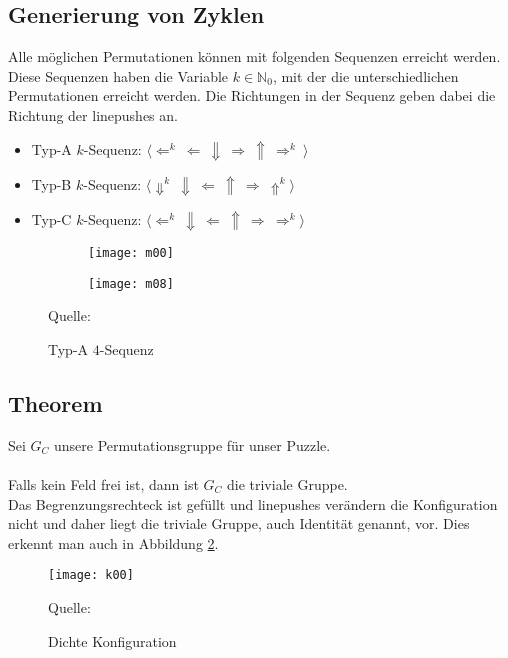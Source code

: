 \documentclass[seminar,german]{algothesis}
\newcommand*{\quelle}{%
  \footnotesize Quelle:
}
\begin{document}
\subsection{Generierung von Zyklen}
Alle möglichen Permutationen können mit folgenden Sequenzen erreicht werden. Diese Sequenzen haben die Variable $k\in \mathbb{N}_0$, mit der die unterschiedlichen Permutationen erreicht werden. Die Richtungen in der Sequenz geben dabei die Richtung der linepushes an.
\begin{itemize}
		\item Typ-A $k$-Sequenz: $\langle  \Leftarrow^k~ \Leftarrow ~\Downarrow~ \Rightarrow ~\Uparrow ~\Rightarrow^k ~\rangle$
		\item Typ-B $k$-Sequenz: $\langle \Downarrow^k ~\Downarrow ~\Leftarrow ~\Uparrow~ \Rightarrow ~\Uparrow ^k\rangle$
		\item Typ-C $k$-Sequenz: $\langle \Leftarrow^k~ \Downarrow ~\Leftarrow~ \Uparrow ~\Rightarrow ~ \Rightarrow^k \rangle$
	\end{itemize}
	
\begin{figure}[ht]
	\centering
	\begin{subfigure}{.25\textwidth}
		\texttt{[image: m00]}
    \end{subfigure}%
    \begin{subfigure}{.25\textwidth}
		\texttt{[image: m08]}
    \end{subfigure}
    \caption{Typ-A $4$-Sequenz}
    \quelle \cite{akitaya2022pushing}
	\label{fig:17}
\end{figure}
\newpage
\subsection{Theorem}
Sei $G_C$ unsere Permutationsgruppe für unser Puzzle.\\\\
Falls kein Feld frei ist, dann ist $G_C$ die triviale Gruppe.\\
Das Begrenzungsrechteck ist gefüllt und linepushes verändern die Konfiguration nicht und daher liegt die triviale Gruppe, auch Identität genannt, vor. Dies erkennt man auch in Abbildung \ref{fig:15}.

\begin{figure}[ht]
	\centering
	\texttt{[image: k00]}
	\caption{Dichte Konfiguration}
	\quelle\cite{akitaya2022pushing}
	\label{fig:15}
\end{figure}
\end{document}

